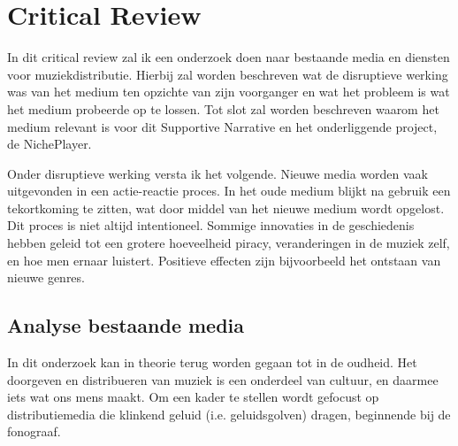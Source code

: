 \section{Critical Review}
\captionsetup[figure]{font=small,labelfont=bf}


In dit critical review zal ik een onderzoek doen naar bestaande media en diensten voor muziekdistributie. Hierbij zal worden beschreven wat de disruptieve werking was van het medium ten opzichte van zijn voorganger en wat het probleem is wat het medium probeerde op te lossen. Tot slot zal worden beschreven waarom het medium relevant is voor dit Supportive Narrative en het onderliggende project, de NichePlayer.

Onder disruptieve werking versta ik het volgende. Nieuwe media worden vaak uitgevonden in een actie-reactie proces. In het oude medium blijkt na gebruik een tekortkoming te zitten, wat door middel van het nieuwe medium wordt opgelost. Dit proces is niet altijd intentioneel. Sommige innovaties in de geschiedenis hebben geleid tot een grotere hoeveelheid piracy, veranderingen in de muziek zelf, en hoe men ernaar luistert. Positieve effecten zijn bijvoorbeeld het ontstaan van nieuwe genres.


\subsection{Analyse bestaande media}
In dit onderzoek kan in theorie terug worden gegaan tot in de oudheid. Het doorgeven en distribueren van muziek is een onderdeel van cultuur, en daarmee iets wat ons mens maakt. Om een kader te stellen wordt gefocust op distributiemedia die klinkend geluid (i.e. geluidsgolven) dragen, beginnende bij de fonograaf.

